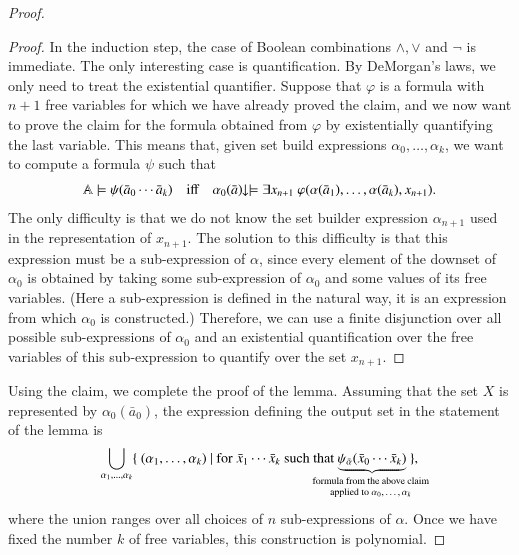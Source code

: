 \begin{proof}
\begin{proof}
		In the induction step, the case of Boolean combinations $\land, \lor$ and $\neg$ is immediate. 
		The only interesting case is  quantification. By DeMorgan's laws, we only need to treat the existential quantifier.  Suppose that $\varphi$ is a formula with $n+1$ free variables for which we have already proved the claim, and we now want to prove the claim for the formula obtained from $\varphi$ by existentially quantifying the last variable. This means that, given set build expressions $\alpha_0,\ldots, \alpha_k$, we want to compute a formula $\psi$ such that
		 		\begin{align*}
			\atoms \models \psi(\bar a_0 \cdots \bar a_k) 
			\quad \text{iff} \quad
	\downset{\alpha_0(\bar a)} \models \exists x_{n+1}\ \varphi(\alpha(\bar a_1),\ldots,\alpha(\bar a_k),x_{n+1}).
\end{align*}
The only difficulty is that we do not know the set builder expression $\alpha_{n+1}$ used in the representation of $x_{n+1}$. The solution to this difficulty is that this expression must be a sub-expression of $\alpha$, since every element of the downset of $\alpha_0$ is obtained by taking some sub-expression of $\alpha_0$ and some values of its free variables. (Here a sub-expression is defined in the natural way, it is an expression from which $\alpha_0$ is constructed.) Therefore, we can use a finite disjunction over all possible sub-expressions of $\alpha_0$ and an existential quantification over the free variables of this sub-expression to quantify over the set $x_{n+1}$.
	\end{proof}

	Using the claim, we complete the proof of the lemma. Assuming that the set $X$ is represented by $\alpha_0(\bar a_0)$, the expression defining the output set in the statement of the lemma is 
	\begin{align*}
	\bigcup_{\alpha_1,\ldots,\alpha_k} 
	\setbuildoneline{ (\alpha_1,\ldots,\alpha_k)}{for $\bar x_1 \cdots \bar x_k$ such that $\myunderbrace{\psi_{\bar \alpha}(\bar x_0 \cdots \bar x_k)}{formula from the above claim \\ applied to $\alpha_0,\ldots,\alpha_k$}$},
	\end{align*}
	where the union ranges over all choices of $n$ sub-expressions of $\alpha$. Once we have fixed the number $k$ of free variables, this construction is polynomial.
\end{proof}




\exercisepart


